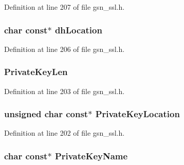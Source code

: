 Definition at line 207 of file gsn\_\-ssl.h.

\hypertarget{a00459_ae4ab0d69e1b5ac49d6468ba5d780c8c2}{
\subsubsection[{dhLocation}]{\setlength{\rightskip}{0pt plus 5cm}char const$\ast$ {\bf dhLocation}}}
\label{a00459_ae4ab0d69e1b5ac49d6468ba5d780c8c2}


Definition at line 206 of file gsn\_\-ssl.h.

\hypertarget{a00459_a998d59b4ae426bc3c1bd394484494a85}{
\subsubsection[{PrivateKeyLen}]{ {\bf PrivateKeyLen}}}
\label{a00459_a998d59b4ae426bc3c1bd394484494a85}


Definition at line 203 of file gsn\_\-ssl.h.

\hypertarget{a00459_a0d8315d61583cc39883e6925c388440a}{
\subsubsection[{PrivateKeyLocation}]{\setlength{\rightskip}{0pt plus 5cm}unsigned char const$\ast$ {\bf PrivateKeyLocation}}}
\label{a00459_a0d8315d61583cc39883e6925c388440a}


Definition at line 202 of file gsn\_\-ssl.h.

\hypertarget{a00459_a7d771bf113c49f357a3eed2709cf112b}{
\subsubsection[{PrivateKeyName}]{\setlength{\rightskip}{0pt plus 5cm}char const$\ast$ {\bf PrivateKeyName}}}
\label{a00459_a7d771bf113c49f357a3eed2709cf112b}


